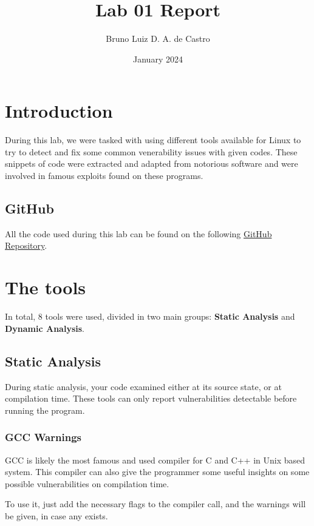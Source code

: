 \documentclass{article}
\title{Lab 01 Report}
\author{Bruno Luiz D. A. de Castro}
\date{January 2024}
\begin{document}
\maketitle

\section{Introduction}

During this lab, we were tasked with using different tools available for Linux to try to detect and fix some common venerability issues with given codes. These snippets of code were extracted and adapted from notorious software and were involved in famous exploits found on these programs.

\subsection{GitHub}

All the code used during this lab can be found on the following \href{https://github.com/bdCastro/ESIEE-secure-c-and-cpp/tree/main/TP1}{GitHub Repository}.

\section{The tools}

In total, 8 tools were used, divided in two main groups: \textbf{Static Analysis} and \textbf{Dynamic Analysis}.

\subsection{Static Analysis}

During static analysis, your code examined either at its source state, or at compilation time. These tools can only report vulnerabilities detectable before running the program.

\subsubsection{GCC Warnings}

GCC is likely the most famous and used compiler for C and C++ in Unix based system. This compiler can also give the programmer some useful insights on some possible vulnerabilities on compilation time.

To use it, just add the necessary flags to the compiler call, and the warnings will be given, in case any exists.
\end{document}
